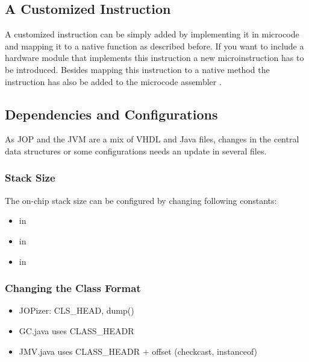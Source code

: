 \subsection{A Customized Instruction}

A customized instruction can be simply added by implementing it in
microcode and mapping it to a native function as described before. If
you want to include a hardware module that implements this
instruction a new microinstruction has to be introduced. Besides
mapping this instruction to a native method the instruction has also
be added to the microcode assembler .

\subsection{Dependencies and Configurations}

As JOP and the JVM are a mix of VHDL and Java files, changes in the
central data structures or some configurations needs an update in
several files.

\subsubsection{Stack Size}

The on-chip stack size can be configured by changing following
constants:

\begin{itemize}
    \item {} in 
    \item {} in 
    \item {} in 
\end{itemize}

\subsubsection{Changing the Class Format}

\begin{itemize}
    \item JOPizer: CLS\_HEAD, dump()
    \item GC.java uses CLASS\_HEADR
    \item JMV.java uses CLASS\_HEADR + offset (checkcast, instanceof)
\end{itemize}




%
%
